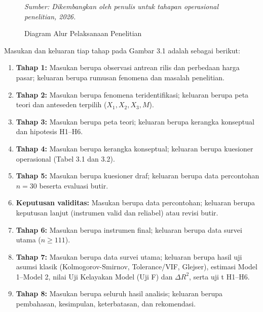 \documentclass[12pt,a4paper]{article}
\numberwithin{equation}{section}
\numberwithin{table}{section}
\numberwithin{figure}{section}
\begin{document}
\begin{figure}[H]
\caption{Diagram Alur Pelaksanaan Penelitian}
\label{fig:alur_penelitian}
\begin{flushleft}
  \footnotesize\textit{Sumber: Dikembangkan oleh penulis untuk tahapan operasional penelitian, 2026.}
\end{flushleft}
\end{figure}

\noindent Masukan dan keluaran tiap tahap pada Gambar 3.1 adalah sebagai berikut:
\begin{enumerate}
  \item \textbf{Tahap 1:} Masukan berupa observasi antrean rilis dan perbedaan harga pasar; keluaran berupa rumusan fenomena dan masalah penelitian.
  \item \textbf{Tahap 2:} Masukan berupa fenomena teridentifikasi; keluaran berupa peta teori dan anteseden terpilih ($X_1, X_2, X_3, M$).
  \item \textbf{Tahap 3:} Masukan berupa peta teori; keluaran berupa kerangka konseptual dan hipotesis H1--H6.
  \item \textbf{Tahap 4:} Masukan berupa kerangka konseptual; keluaran berupa kuesioner operasional (Tabel 3.1 dan 3.2).
  \item \textbf{Tahap 5:} Masukan berupa kuesioner draf; keluaran berupa data percontohan $n=30$ beserta evaluasi butir.
  \item \textbf{Keputusan validitas:} Masukan berupa data percontohan; keluaran berupa keputusan lanjut (instrumen valid dan reliabel) atau revisi butir.
  \item \textbf{Tahap 6:} Masukan berupa instrumen final; keluaran berupa data survei utama ($n \ge 111$).
  \item \textbf{Tahap 7:} Masukan berupa data survei utama; keluaran berupa hasil uji asumsi klasik (Kolmogorov-Smirnov, Tolerance/VIF, Glejser), estimasi Model 1--Model 2, nilai Uji Kelayakan Model (Uji F) dan $\Delta R^2$, serta uji t H1--H6.
  \item \textbf{Tahap 8:} Masukan berupa seluruh hasil analisis; keluaran berupa pembahasan, kesimpulan, keterbatasan, dan rekomendasi.
\end{enumerate}
\end{document}

